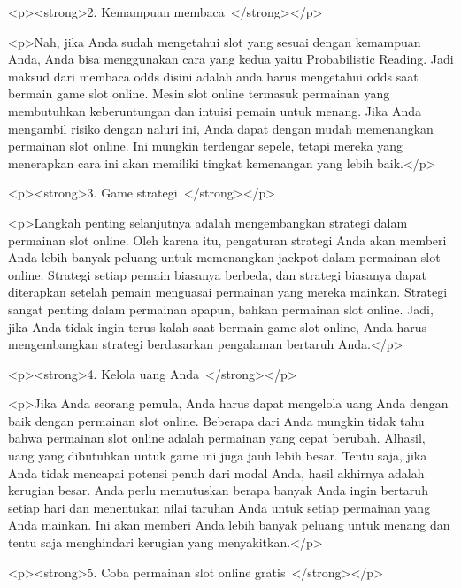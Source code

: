{<p><strong>2. Kemampuan membaca </strong></p>



<p>Nah, jika Anda sudah mengetahui slot yang sesuai dengan kemampuan Anda, Anda bisa menggunakan cara yang kedua yaitu Probabilistic Reading. Jadi maksud dari membaca odds disini adalah anda harus mengetahui odds saat bermain game slot online. Mesin slot online termasuk permainan yang membutuhkan keberuntungan dan intuisi pemain untuk menang. Jika Anda mengambil risiko dengan naluri ini, Anda dapat dengan mudah memenangkan permainan slot online. Ini mungkin terdengar sepele, tetapi mereka yang menerapkan cara ini akan memiliki tingkat kemenangan yang lebih baik.</p>



<p><strong>3. Game strategi </strong></p>



<p>Langkah penting selanjutnya adalah mengembangkan strategi dalam permainan slot online. Oleh karena itu, pengaturan strategi Anda akan memberi Anda lebih banyak peluang untuk memenangkan jackpot dalam permainan slot online. Strategi setiap pemain biasanya berbeda, dan strategi biasanya dapat diterapkan setelah pemain menguasai permainan yang mereka mainkan. Strategi sangat penting dalam permainan apapun, bahkan permainan slot online. Jadi, jika Anda tidak ingin terus kalah saat bermain game slot online, Anda harus mengembangkan strategi berdasarkan pengalaman bertaruh Anda.</p>



<p><strong>4. Kelola uang Anda </strong></p>



<p>Jika Anda seorang pemula, Anda harus dapat mengelola uang Anda dengan baik dengan permainan slot online. Beberapa dari Anda mungkin tidak tahu bahwa permainan slot online adalah permainan yang cepat berubah. Alhasil, uang yang dibutuhkan untuk game ini juga jauh lebih besar. Tentu saja, jika Anda tidak mencapai potensi penuh dari modal Anda, hasil akhirnya adalah kerugian besar. Anda perlu memutuskan berapa banyak Anda ingin bertaruh setiap hari dan menentukan nilai taruhan Anda untuk setiap permainan yang Anda mainkan. Ini akan memberi Anda lebih banyak peluang untuk menang dan tentu saja menghindari kerugian yang menyakitkan.</p>



<p><strong>5. Coba permainan slot online gratis </strong></p>



}
